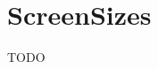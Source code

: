 \documentclass[FIPLY_base.tex]{subfiles}
\author{Andreas Denkmayr}
\date{25. Februar 2016}
\begin{document}
\section{ScreenSizes}
TODO
\end{document}
